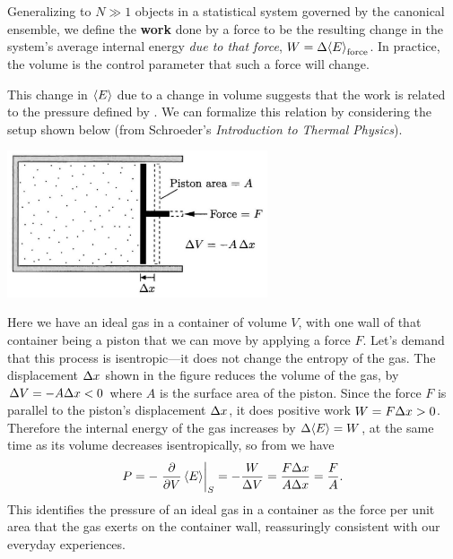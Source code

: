 \begin{shaded}
  Generalizing to $N \gg 1$ objects in a statistical system governed by the canonical ensemble, we define the \textbf{work} done by a force to be the resulting change in the system's average internal energy \textit{due to that force}, $W = \Delta\!\left\langle E \right\rangle_{\text{force}}$.
  In practice, the volume is the control parameter that such a force will change.
\end{shaded}

This change in $\left\langle E \right\rangle$ due to a change in volume suggests that the work is related to the pressure defined by .
We can formalize this relation by considering the setup shown below (from Schroeder's \textit{Introduction to Thermal Physics}). \\[-24 pt]
\begin{center}
  \includegraphics[width=0.575\textwidth]{figs/unit05_piston.pdf} %
\end{center}

Here we have an ideal gas in a container of volume $V$, with one wall of that container being a piston that we can move by applying a force $F$.
Let's demand that this process is isentropic---it does not change the entropy of the gas.
The displacement $\Delta x$ shown in the figure reduces the volume of the gas, by $\Delta V = -A\Delta x < 0$ where $A$ is the surface area of the piston.
Since the force $F$ is parallel to the piston's displacement $\Delta x$, it does positive work $W = F\Delta x > 0$.
Therefore the internal energy of the gas increases by $\Delta\!\left\langle E \right\rangle = W$, at the same time as its volume decreases isentropically, so from  we have
\begin{equation}
  P = -\left. \frac{\partial }{\partial V} \left\langle E \right\rangle\right|_S = -\frac{W}{\Delta V} = \frac{F\Delta x}{A\Delta x} = \frac{F}{A}.
\end{equation}
This identifies the pressure of an ideal gas in a container as the force per unit area that the gas exerts on the container wall, reassuringly consistent with our everyday experiences.

